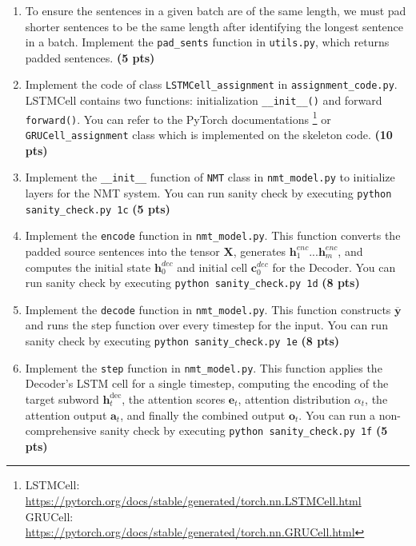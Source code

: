 \documentclass{assignment format}
\newcommand{\hdec}{\mathbf{h}^{\text{dec}}}
\begin{document}
\begin{enumerate}[label=(\alph*)]

    \item To ensure the sentences in a given batch are of the same length, we must pad shorter sentences to be the same length after identifying the longest sentence in a batch. Implement the \texttt{pad\_sents} function in \texttt{utils.py}, which returns padded sentences. \textbf{(5 pts)}
    
    \item Implement the code of class \texttt{LSTMCell\_assignment} in \texttt{assignment\_code.py}. LSTMCell contains two functions: initialization \texttt{\_\_init\_\_()} and forward \texttt{forward()}. You can refer to the PyTorch documentations
    \footnote{LSTMCell: \url{https://pytorch.org/docs/stable/generated/torch.nn.LSTMCell.html} \newline 
    GRUCell: \url{https://pytorch.org/docs/stable/generated/torch.nn.GRUCell.html}}
    or \texttt{GRUCell\_assignment} class which is implemented on the skeleton code.  \textbf{(10 pts)}
    
   \item Implement the \texttt{\_\_init\_\_} function of \texttt{NMT} class in \texttt{nmt\_model.py} to initialize layers for the NMT system. You can run sanity check by executing \texttt{python sanity\_check.py 1c} \textbf{(5 pts)}
   
    \item Implement the \texttt{encode} function in \texttt{nmt\_model.py}. This function converts the padded source sentences into the tensor $\mathbf{X}$, generates $\mathbf{h}^{enc}_1$...$\mathbf{h}^{enc}_m$, and computes the initial state $\mathbf{h}^{dec}_0$ and initial cell $\mathbf{c}^{dec}_0$ for the Decoder. You can run sanity check by executing \texttt{python sanity\_check.py 1d} \textbf{(8 pts)}
    
    \item Implement the \texttt{decode} function in \texttt{nmt\_model.py}. This function constructs $\overline{\mathbf{y}}$ 
    and runs the step function over every timestep for the input. You can run sanity check by executing \texttt{python sanity\_check.py 1e} \textbf{(8 pts)}
    
    \item Implement the \texttt{step} function in \texttt{nmt\_model.py}. This function applies the Decoder's LSTM cell for a single timestep, computing the encoding of the target subword $\hdec_t$, the attention scores $\mathbf{e}_t$, attention distribution $\alpha_t$, the attention output $\mathbf{a}_{t}$, and finally the combined output $\mathbf{o}_t$. You can run a non-comprehensive sanity check by executing \texttt{python sanity\_check.py 1f}  \textbf{(5 pts)}
    

\end{enumerate}
\end{document}
